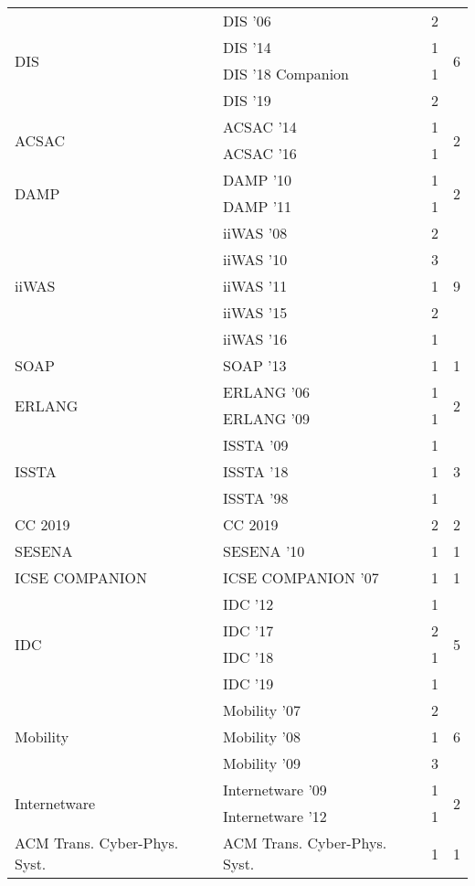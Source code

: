 \begin{table*}[t]
\begin{tabular}{llrr}
\multirow{4}{*}{DIS } & DIS '06 & 2 & \multirow{4}{*}{6}\\
& DIS '14 & 1 &\\
& DIS '18 Companion & 1 &\\
& DIS '19 & 2 &\\
\multirow{2}{*}{ACSAC } & ACSAC '14 & 1 & \multirow{2}{*}{2}\\
& ACSAC '16 & 1 &\\
\multirow{2}{*}{DAMP } & DAMP '10 & 1 & \multirow{2}{*}{2}\\
& DAMP '11 & 1 &\\
\multirow{5}{*}{iiWAS } & iiWAS '08 & 2 & \multirow{5}{*}{9}\\
& iiWAS '10 & 3 &\\
& iiWAS '11 & 1 &\\
& iiWAS '15 & 2 &\\
& iiWAS '16 & 1 &\\
\multirow{1}{*}{SOAP } & SOAP '13 & 1 & \multirow{1}{*}{1}\\
\multirow{2}{*}{ERLANG } & ERLANG '06 & 1 & \multirow{2}{*}{2}\\
& ERLANG '09 & 1 &\\
\multirow{3}{*}{ISSTA } & ISSTA '09 & 1 & \multirow{3}{*}{3}\\
& ISSTA '18 & 1 &\\
& ISSTA '98 & 1 &\\
\multirow{1}{*}{CC 2019} & CC 2019 & 2 & \multirow{1}{*}{2}\\
\multirow{1}{*}{SESENA } & SESENA '10 & 1 & \multirow{1}{*}{1}\\
\multirow{1}{*}{ICSE COMPANION } & ICSE COMPANION '07 & 1 & \multirow{1}{*}{1}\\
\multirow{4}{*}{IDC } & IDC '12 & 1 & \multirow{4}{*}{5}\\
& IDC '17 & 2 &\\
& IDC '18 & 1 &\\
& IDC '19 & 1 &\\
\multirow{3}{*}{Mobility } & Mobility '07 & 2 & \multirow{3}{*}{6}\\
& Mobility '08 & 1 &\\
& Mobility '09 & 3 &\\
\multirow{2}{*}{Internetware } & Internetware '09 & 1 & \multirow{2}{*}{2}\\
& Internetware '12 & 1 &\\
\multirow{1}{*}{ACM Trans. Cyber-Phys. Syst.} & ACM Trans. Cyber-Phys. Syst. & 1 & \multirow{1}{*}{1}\\

\end{tabular}
\end{table*}
